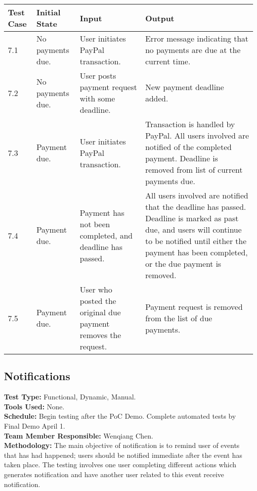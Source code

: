 \documentclass[12pt]{article}
\begin{document}
\begin{longtable}{|p{2cm}|p{3cm}|p{5cm}|p{5cm}|}
\hline
\textbf{Test Case} & \textbf{Initial State} & \textbf{Input} & \textbf{Output} \\ \hline
7.1 & No payments due. & User initiates PayPal transaction. & Error message indicating that no payments are due at the current time.\\
\hline
7.2 & No payments due. & User posts payment request with some deadline. & New payment deadline added.\\
\hline
7.3 & Payment due. & User initiates PayPal transaction. & Transaction is handled by PayPal. All users involved are notified of the completed payment. Deadline is removed from list of current payments due.\\
\hline
7.4 & Payment due. & Payment has not been completed, and deadline has passed. & All users involved are notified that the deadline has passed. Deadline is marked as past due, and users will continue to be notified until either the payment has been completed, or the due payment is removed.\\
\hline
7.5 & Payment due. & User who posted the original due payment removes the request. & Payment request is removed from the list of due payments.\\
\hline
\end{longtable}


\subsection{Notifications}
\textbf{Test Type:} Functional, Dynamic, Manual. \\
\textbf{Tools Used:} None. \\
\textbf{Schedule:} Begin testing after the PoC Demo. Complete automated tests by Final Demo April 1. \\
\textbf{Team Member Responsible:} Wenqiang Chen. \\
\textbf{Methodology:} The main objective of notification is to remind user of events that has had happened; users should be notified immediate after the event has taken place. The testing involves one user completing different actions which generates notification and have another user related to this event receive notification.
\end{document}
